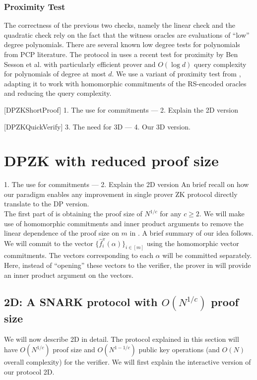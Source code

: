 \subsubsection{Proximity Test}
The correctness of the previous two checks, namely the linear check and the
quadratic check rely on the fact that the witness oracles are evaluations of
``low'' degree polynomials. There are several known low degree tests for polynomials
from PCP literature. The protocol in \cite{Aurora} uses a recent test for
proximity by Ben Sesson et al.\cite{IOPP_FRI2018} with particularly efficient
prover and $O(\log d)$ query complexity for polynomials of degree at most $d$. 
We use a variant of proximity test from \cite{Ligero2017}, adapting it to work
with homomorphic commitments of the RS-encoded oracles and reducing the query
complexity.


[DPZKShortProof]
1. The use for commitments --- 2. Explain the 2D version  

[DPZKQuickVerify]
3. The need for 3D --- 4. Our 3D version.


\section{DPZK with reduced proof size}
1. The use for commitments --- 2. Explain the 2D version  
An brief recall on how our paradigm enables any improvement in single prover ZK protocol directly translate to the DP version.\\

The first part of \name{} is obtaining the proof size of $N^{1/c}$ for any $c \geq 2$.
We will make use of homomorphic commitments and inner product arguments to remove the linear dependence of the proof size on $m$ in \cite{ligero}. A brief summary of our idea follows. We will commit to the vector $\{\hat{f}^x_i(\alpha)\}_{i \in [m]}$ using the homomorphic vector commitments. The vectors corresponding to each $\alpha$ will be committed separately. Here, instead of ``opening'' these vectors to the verifier, the prover in \name{} will provide an inner product argument on the vectors.


\subsection{\name2D{}: A SNARK protocol with $O(N^{1/c})$ proof size}

We will now describe \name2D{} in detail. The protocol explained in this section will have $O(N^{1/c})$ proof size and $O(N^{1-1/c})$ public key operations (and $O(N)$ overall complexity) for the verifier. We will first explain the interactive version of our protocol \name2D{}. \\

